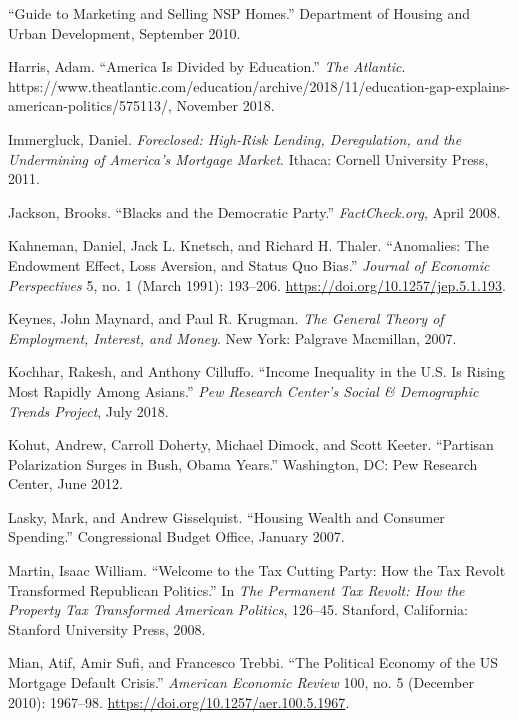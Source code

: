 \documentclass[
]{article}
\begin{document}
\leavevmode\hypertarget{ref-2010guide}{}%
``Guide to Marketing and Selling NSP Homes.'' Department of Housing and Urban Development, September 2010.

\leavevmode\hypertarget{ref-harris2018america}{}%
Harris, Adam. ``America Is Divided by Education.'' \emph{The Atlantic}. https://www.theatlantic.com/education/archive/2018/11/education-gap-explains-american-politics/575113/, November 2018.

\leavevmode\hypertarget{ref-immergluck2011foreclosed}{}%
Immergluck, Daniel. \emph{Foreclosed: High-Risk Lending, Deregulation, and the Undermining of America's Mortgage Market}. Ithaca: Cornell University Press, 2011.

\leavevmode\hypertarget{ref-jackson2008blacks}{}%
Jackson, Brooks. ``Blacks and the Democratic Party.'' \emph{FactCheck.org}, April 2008.

\leavevmode\hypertarget{ref-kahneman1991anomalies}{}%
Kahneman, Daniel, Jack L. Knetsch, and Richard H. Thaler. ``Anomalies: The Endowment Effect, Loss Aversion, and Status Quo Bias.'' \emph{Journal of Economic Perspectives} 5, no. 1 (March 1991): 193--206. \url{https://doi.org/10.1257/jep.5.1.193}.

\leavevmode\hypertarget{ref-keynes2007general}{}%
Keynes, John Maynard, and Paul R. Krugman. \emph{The General Theory of Employment, Interest, and Money}. New York: Palgrave Macmillan, 2007.

\leavevmode\hypertarget{ref-kochhar2018income}{}%
Kochhar, Rakesh, and Anthony Cilluffo. ``Income Inequality in the U.S. Is Rising Most Rapidly Among Asians.'' \emph{Pew Research Center's Social \& Demographic Trends Project}, July 2018.

\leavevmode\hypertarget{ref-kohut2012partisan}{}%
Kohut, Andrew, Carroll Doherty, Michael Dimock, and Scott Keeter. ``Partisan Polarization Surges in Bush, Obama Years.'' Washington, DC: Pew Research Center, June 2012.

\leavevmode\hypertarget{ref-lasky2007housing}{}%
Lasky, Mark, and Andrew Gisselquist. ``Housing Wealth and Consumer Spending.'' Congressional Budget Office, January 2007.

\leavevmode\hypertarget{ref-martin2008welcome}{}%
Martin, Isaac William. ``Welcome to the Tax Cutting Party: How the Tax Revolt Transformed Republican Politics.'' In \emph{The Permanent Tax Revolt: How the Property Tax Transformed American Politics}, 126--45. Stanford, California: Stanford University Press, 2008.

\leavevmode\hypertarget{ref-mianPoliticalEconomyUS2010}{}%
Mian, Atif, Amir Sufi, and Francesco Trebbi. ``The Political Economy of the US Mortgage Default Crisis.'' \emph{American Economic Review} 100, no. 5 (December 2010): 1967--98. \url{https://doi.org/10.1257/aer.100.5.1967}.
\end{document}
